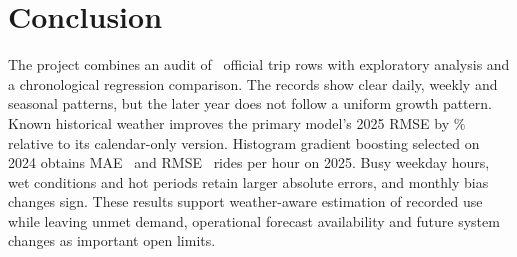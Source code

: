 \documentclass[10pt]{article}
\begin{document}
\section{Conclusion}
The project combines an audit of \NRaw\ official trip rows with exploratory analysis and a chronological regression comparison. The records show clear daily, weekly and seasonal patterns, but the later year does not follow a uniform growth pattern. Known historical weather improves the primary model's 2025 RMSE by \WeatherRMSEGain\% relative to its calendar-only version. Histogram gradient boosting selected on 2024 obtains MAE \PrimaryMAE\ and RMSE \PrimaryRMSE\ rides per hour on 2025. Busy weekday hours, wet conditions and hot periods retain larger absolute errors, and monthly bias changes sign. These results support weather-aware estimation of recorded use while leaving unmet demand, operational forecast availability and future system changes as important open limits.



\end{document}
